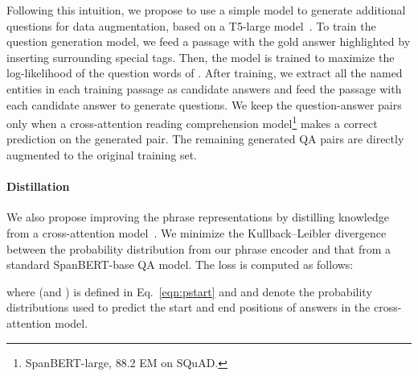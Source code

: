 \documentclass[11pt,a4paper]{article}
\begin{document}
\begin{comment}
Suppose that we are given a passage with the following question-answer pair in the training set:
\begin{quote}
\small
 \textit{Queen Elizabeth II is the sovereign, and her heir apparent is her eldest son, \textbf{Charles, Prince of Wales}. (...) Third in line is Prince George, the eldest child of the Duke of Cambridge (...)} \\
 \textit{who is next in line to be the monarch of england} \\
 \textit{\textbf{Charles, Prince of Wales}}
\end{quote}
\vspace{-0.5em}
\noindent While cross-attention models only need to represent the passage focusing on ``who is Queen Elizabeth II's heir apparent,'' our phrase encoder should take all the other phrases into account, (e.g.,  \textit{Prince George}), because their representations will be re-used for other questions (e.g.,  \textit{who is the eldest child of the duke of cambridge}).
\end{comment}

Following this intuition, we propose to use a simple model to generate additional questions for data augmentation, based on a T5-large model~\cite{raffel2020exploring}.
To train the question generation model, we feed a passage  with the gold answer  highlighted by inserting surrounding special tags.
Then, the model is trained to maximize the log-likelihood of the question words of .
After training, we extract all the named entities in each training passage as candidate answers and feed the passage  with each candidate answer to generate questions.
We keep the question-answer pairs only when a cross-attention reading comprehension model\footnote{SpanBERT-large, 88.2 EM on SQuAD.} makes a correct prediction on the generated pair.
The remaining generated QA pairs  are directly augmented to the original training set.


\paragraph{Distillation} We also propose improving the phrase representations by distilling knowledge from a cross-attention model~\citep{hinton2015distilling}.
We minimize the Kullback–Leibler divergence between the probability distribution from our phrase encoder and that from a standard SpanBERT-base QA model. The loss is computed as follows:

where  (and ) is defined in Eq.~\eqref{eqn:pstart} and  and  denote the probability distributions used to predict the start and end positions of answers in the cross-attention model.
\end{document}
